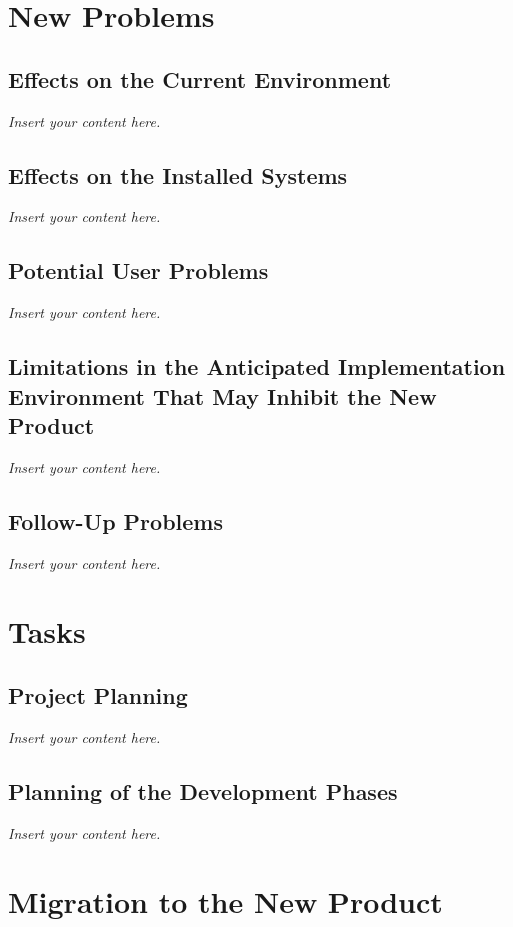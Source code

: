 \documentclass[12pt]{article}
\newcommand{\lips}{\textit{Insert your content here.}}
\begin{document}
\section{New Problems}
\subsection{Effects on the Current Environment}
\lips
\subsection{Effects on the Installed Systems}
\lips
\subsection{Potential User Problems}
\lips
\subsection{Limitations in the Anticipated Implementation Environment That May
Inhibit the New Product}
\lips
\subsection{Follow-Up Problems}
\lips

\section{Tasks}
\subsection{Project Planning}
\lips
\subsection{Planning of the Development Phases}
\lips

\section{Migration to the New Product}
\end{document}
